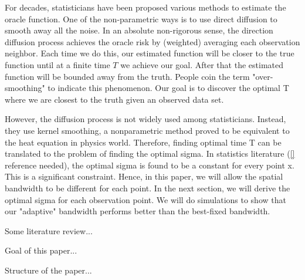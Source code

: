 \documentclass{article}
\begin{document}
For decades, statisticians have been proposed various methods to estimate the oracle function. One of the non-parametric ways is to use direct diffusion to smooth away all the noise. In an absolute non-rigorous sense, the direction diffusion process achieves the oracle risk by (weighted) averaging each observation neighbor. Each time we do this, our estimated function will be closer to the true function until at a finite time $T$ we achieve our goal. After that the estimated function will be bounded away from the truth. People coin the term "over-smoothing" to indicate this phenomenon. Our goal is to discover the optimal T where we are closest to the truth given an observed data set. 

However, the diffusion process is not widely used among statisticians. Instead, they use kernel smoothing, a nonparametric method proved to be equivalent to the heat equation in physics world. Therefore, finding optimal time T can be translated to the problem of finding the optimal sigma. 
In statistics literature (\ref{} reference needed), the optimal sigma is found to be a constant for every point x. This is a significant constraint. Hence, in this paper, we will allow the spatial bandwidth to be different for each point. In the next section, we will derive the optimal sigma for each observation point. We will do simulations to show that our "adaptive" bandwidth performs better than the best-fixed bandwidth. 


Some literature review...

Goal of this paper...

Structure of the paper...
\end{document}
